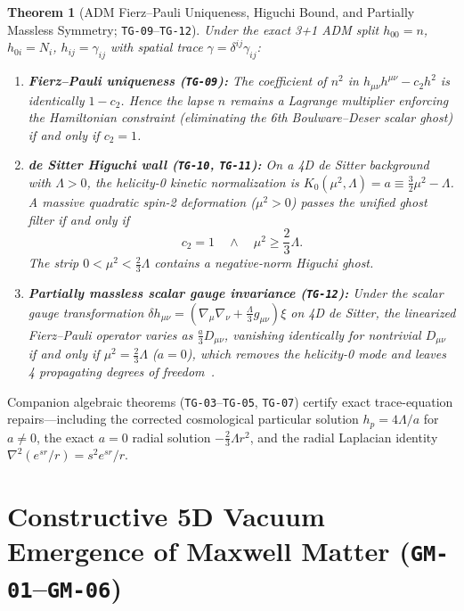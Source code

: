 \documentclass[11pt,a4paper]{article}
\theoremstyle{plain}
\newtheorem{theorem}{Theorem}[section]
\theoremstyle{remark}
\newcommand{\code}[1]{\texttt{\small #1}}
\begin{document}
\begin{theorem}[ADM Fierz--Pauli Uniqueness, Higuchi Bound, and Partially Massless Symmetry; \code{TG-09}--\code{TG-12}]
\label{thm:tg09-12}
Under the exact 3+1 ADM split $h_{00} = n$, $h_{0i} = N_i$, $h_{ij} = \gamma_{ij}$ with spatial trace $\gamma = \delta^{ij}\gamma_{ij}$:
\begin{enumerate}
  \item \textbf{Fierz--Pauli uniqueness (\code{TG-09}):} The coefficient of $n^2$ in $h_{\mu\nu}h^{\mu\nu} - c_2 h^2$ is identically $1 - c_2$. Hence the lapse $n$ remains a Lagrange multiplier enforcing the Hamiltonian constraint (eliminating the 6th Boulware--Deser scalar ghost) if and only if $c_2 = 1$.
  \item \textbf{de Sitter Higuchi wall (\code{TG-10}, \code{TG-11}):} On a 4D de Sitter background with $\Lambda > 0$, the helicity-0 kinetic normalization is $K_0(\mu^2,\Lambda) = a \equiv \tfrac{3}{2}\mu^2 - \Lambda$. A massive quadratic spin-2 deformation ($\mu^2 > 0$) passes the unified ghost filter if and only if
  \begin{equation}
    c_2 = 1 \quad \wedge \quad \mu^2 \ge \frac{2}{3}\Lambda.
  \end{equation}
  The strip $0 < \mu^2 < \tfrac{2}{3}\Lambda$ contains a negative-norm Higuchi ghost.
  \item \textbf{Partially massless scalar gauge invariance (\code{TG-12}):} Under the scalar gauge transformation $\delta h_{\mu\nu} = (\nabla_\mu\nabla_\nu + \tfrac{\Lambda}{3}g_{\mu\nu})\xi$ on 4D de Sitter, the linearized Fierz--Pauli operator varies as $\tfrac{a}{3} D_{\mu\nu}$, vanishing identically for nontrivial $D_{\mu\nu}$ if and only if $\mu^2 = \tfrac{2}{3}\Lambda$ ($a = 0$), which removes the helicity-0 mode and leaves 4 propagating degrees of freedom~\cite{DeserNepomechie1983}.
\end{enumerate}
\end{theorem}

Companion algebraic theorems (\code{TG-03}--\code{TG-05}, \code{TG-07}) certify exact trace-equation repairs—including the corrected cosmological particular solution $h_p = 4\Lambda/a$ for $a \neq 0$, the exact $a=0$ radial solution $-\tfrac{2}{3}\Lambda r^2$, and the radial Laplacian identity $\nabla^2(e^{sr}/r) = s^2 e^{sr}/r$.

\section{Constructive 5D Vacuum Emergence of Maxwell Matter (\code{GM-01}--\code{GM-06})}
\label{sec:5d-emergence}
\end{document}
